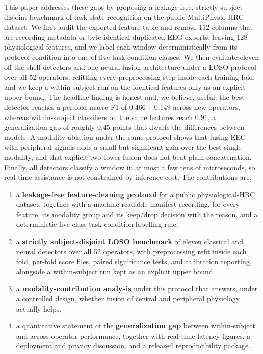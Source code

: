 \documentclass{llncs}
\begin{document}
This paper addresses these gaps by proposing a leakage-free, strictly subject-disjoint
benchmark of task-state recognition on the public MultiPhysio-\ac{HRC} dataset. We
first audit the exported feature table and remove 112 columns that are recording
metadata or byte-identical duplicated \ac{EEG} exports, leaving 128 physiological
features, and we label each window deterministically from its protocol condition into
one of five task-condition classes. We then evaluate eleven off-the-shelf detectors
and one neural fusion architecture under a \ac{LOSO} protocol over all 52 operators,
refitting every preprocessing step inside each training fold, and we keep a
within-subject run on the identical features only as an explicit upper bound. The
headline finding is honest and, we believe, useful: the best detector reaches a
per-fold macro-F1 of $0.466\pm0.149$ across new operators, whereas within-subject
classifiers on the same features reach $0.91$, a generalization gap of roughly $0.45$
points that dwarfs the differences between models. A modality ablation under the same
protocol shows that fusing \ac{EEG} with peripheral signals adds a small but
significant gain over the best single modality, and that explicit two-tower fusion
does not beat plain concatenation. Finally, all detectors classify a window in at most
a few tens of microseconds, so real-time assistance is not constrained by inference
cost. The contributions are:

\begin{enumerate}
\item a \textbf{leakage-free feature-cleaning protocol} for a public
physiological-\ac{HRC} dataset, together with a machine-readable manifest
recording, for every feature, its modality group and its keep/drop decision with the
reason, and a deterministic five-class task-condition labelling rule.
\item a \textbf{strictly subject-disjoint \ac{LOSO} benchmark} of eleven classical and
neural detectors over all 52 operators, with preprocessing refit inside each fold,
per-fold score files, paired significance tests, and calibration reporting, alongside
a within-subject run kept as an explicit upper bound.
\item a \textbf{modality-contribution analysis} under this protocol that answers,
under a controlled design, whether fusion of central and peripheral physiology
actually helps.
\item a quantitative statement of the \textbf{generalization gap} between within-subject
and across-operator performance, together with real-time latency figures, a deployment
and privacy discussion, and a released reproducibility package.
\end{enumerate}
\end{document}
